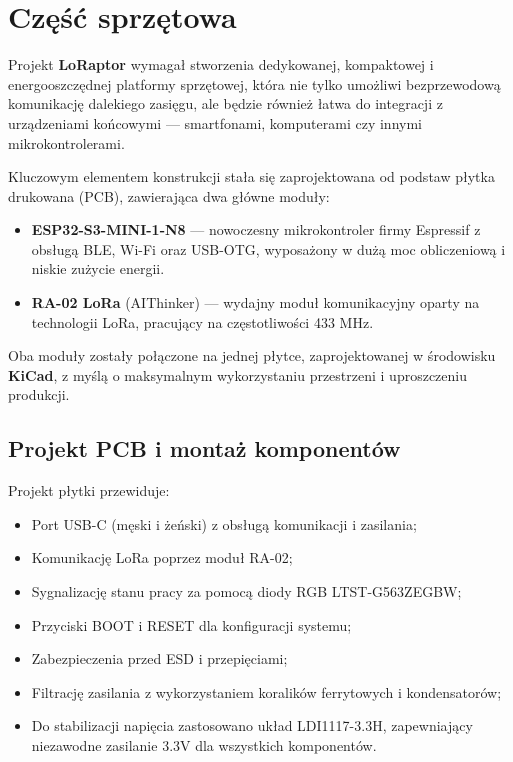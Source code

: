 \section{Część sprzętowa}

Projekt \textbf{LoRaptor} wymagał stworzenia dedykowanej, kompaktowej i energooszczędnej platformy sprzętowej, która nie tylko umożliwi bezprzewodową komunikację dalekiego zasięgu, ale będzie również łatwa do integracji z urządzeniami końcowymi — smartfonami, komputerami czy innymi mikrokontrolerami. 

Kluczowym elementem konstrukcji stała się zaprojektowana od podstaw płytka drukowana (PCB), zawierająca dwa główne moduły:
\begin{itemize}
	\item \textbf{ESP32-S3-MINI-1-N8} --- nowoczesny mikrokontroler firmy Espressif z obsługą BLE, Wi-Fi oraz USB-OTG, wyposażony w dużą moc obliczeniową i niskie zużycie energii.
	\item \textbf{RA-02 LoRa} (AIThinker) --- wydajny moduł komunikacyjny oparty na technologii LoRa, pracujący na częstotliwości 433 MHz.
\end{itemize}
Oba moduły zostały połączone na jednej płytce, zaprojektowanej w środowisku \textbf{KiCad}, z myślą o maksymalnym wykorzystaniu przestrzeni i uproszczeniu produkcji.

\clearpage
\subsection{Projekt PCB i montaż komponentów}

Projekt płytki przewiduje:
\begin{itemize}
	\item Port USB-C (męski i żeński) z obsługą komunikacji i zasilania;
	\item Komunikację LoRa poprzez moduł RA-02;
	\item Sygnalizację stanu pracy za pomocą diody RGB LTST-G563ZEGBW;
	\item Przyciski BOOT i RESET dla konfiguracji systemu;
	\item Zabezpieczenia przed ESD i przepięciami;
	\item Filtrację zasilania z wykorzystaniem koralików ferrytowych i kondensatorów;
	\item Do stabilizacji napięcia zastosowano układ LDI1117-3.3H, zapewniający niezawodne zasilanie 3.3V dla wszystkich komponentów.
\end{itemize}

